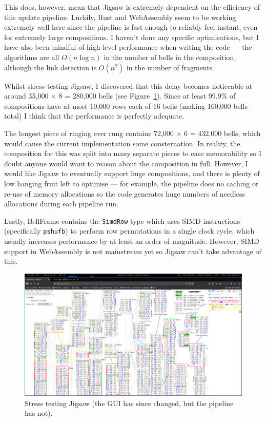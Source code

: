 \documentclass[12pt]{article}
\begin{document}
This does, however, mean that Jigsaw is extremely dependent on the efficiency of this update
pipeline.  Luckily, Rust and WebAssembly seem to be working extremely well here since the pipeline
is fast enough to reliably feel instant, even for extremely large compositions.  I haven't done any
specific optimisations, but I have also been mindful of high-level performance when writing the code
--- the algorithms are all $O(n \log n)$ in the number of bells in the composition, although the
link detection is $O(n^2)$ in the number of fragments.

Whilst stress testing Jigsaw, I discovered that this delay becomes noticeable at around 35,000
$\times$ 8 = 280,000 bells (see Figure~\ref{fig:stress-test}).  Since at least 99.9\% of
compositions have at most 10,000 rows each of 16 bells (making 160,000 bells total) I think that the
performance is perfectly adequate.

The longest piece of ringing ever rung contains 72,000 $\times$ 6 = 432,000 bells, which would cause
the current implementation some consternation.  In reality, the composition for this was split into
many separate pieces to ease memorability so I doubt anyone would want to reason about the
composition in full.  However, I would like Jigsaw to eventually support huge compositions, and
there is plenty of low hanging fruit left to optimise --- for example, the pipeline does no caching
or re-use of memory allocations so the code generates huge numbers of needless allocations during
each pipeline run.

Lastly, BellFrame contains the \verb|SimdRow| type which uses SIMD instructions
(specifically \verb|pshufb|) to perform row permutations in a single clock cycle, which usually
increases performance by at least an order of magnitude.  However, SIMD support in WebAssembly is
not mainstream yet so Jigsaw can't take advantage of this.

\begin{figure}
    \centering
    \includegraphics[width=\textwidth]{stress-test}
    \caption{Stress testing Jigsaw (the GUI has since changed, but the pipeline has
    not).}\label{fig:stress-test}
\end{figure}
\end{document}
